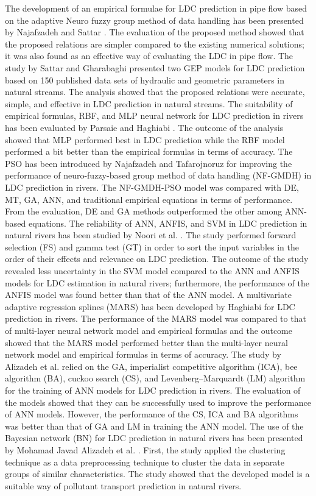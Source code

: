 \documentclass[a4paper,12pt, english]{article}
\begin{document}
The development of an empirical formulae for LDC prediction in pipe flow based on the adaptive Neuro fuzzy group method of data handling has been presented by Najafzadeh and Sattar \cite{najafzadeh2015neuro}. The evaluation of the proposed method showed that the proposed relations are simpler compared to the existing numerical solutions; it was also found as an effective way of evaluating the LDC in pipe flow. The study by Sattar and Gharabaghi \cite{sattar2015gene} presented two GEP models for LDC prediction based on 150 published data sets of hydraulic and geometric parameters in natural streams. The analysis showed that the proposed relations were accurate, simple, and effective in LDC prediction in natural streams. The suitability of empirical formulas, RBF, and MLP neural network for LDC prediction in rivers has been evaluated by Parsaie and Haghiabi \cite{parsaie2015predicting}. The outcome of the analysis showed that MLP performed best in LDC prediction while the RBF model performed a bit better than the empirical formulas in terms of accuracy. The PSO has been introduced by Najafzadeh and Tafarojnoruz \cite{najafzadeh2016evaluation} for improving the performance of neuro-fuzzy-based group method of data handling (NF-GMDH) in LDC prediction in rivers. The NF-GMDH-PSO model was compared with DE, MT, GA, ANN, and traditional empirical equations in terms of performance. From the evaluation, DE and GA methods outperformed the other among ANN-based equations. The reliability of ANN, ANFIS, and SVM in LDC prediction in natural rivers has been studied by Noori et al. \cite{noori2016reliable}. The study performed forward selection (FS) and gamma test (GT) in order to sort the input variables in the order of their effects and relevance on LDC prediction. The outcome of the study revealed less uncertainty in the SVM model compared to the ANN and ANFIS models for LDC estimation in natural rivers; furthermore, the performance of the ANFIS model was found better than that of the ANN model. A multivariate adaptive regression splines (MARS) has been developed by Haghiabi \cite{haghiabi2016prediction} for LDC prediction in rivers. The performance of the MARS model was compared to that of multi-layer neural network model and empirical formulas and the outcome showed that the MARS model performed better than the multi-layer neural network model and empirical formulas in terms of accuracy. The study by Alizadeh et al. \cite{alizadeh2017predicting} relied on the GA, imperialist competitive algorithm (ICA), bee algorithm (BA), cuckoo search (CS), and Levenberg–Marquardt (LM) algorithm for the training of ANN models for LDC prediction in rivers. The evaluation of the models showed that they can be successfully used to improve the performance of ANN models. However, the performance of the CS, ICA and BA algorithms was better than that of GA and LM in training the ANN model. The use of the Bayesian network (BN) for LDC prediction in natural rivers has been presented by Mohamad Javad Alizadeh et al. \cite{alizadeh2017prediction}. First, the study applied the clustering technique as a data preprocessing technique to cluster the data in separate groups of similar characteristics. The study showed that the developed model is a suitable way of pollutant transport prediction in natural rivers.
\end{document}
